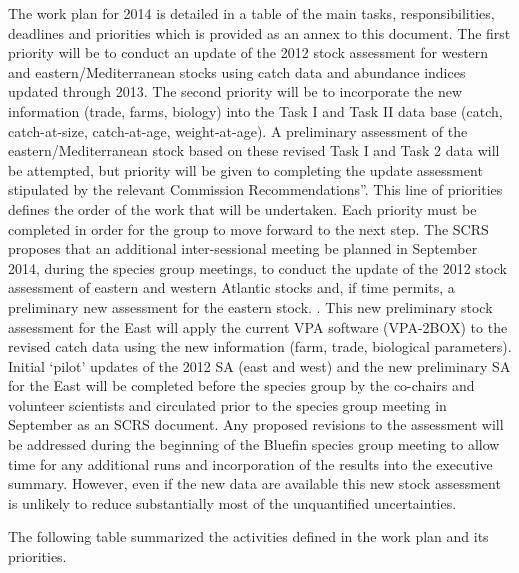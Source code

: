 The work plan for 2014 is detailed in a table of the main tasks, responsibilities, deadlines and priorities which is provided as an annex to this document. The first priority will be to conduct an update of the 2012 stock assessment for western and eastern/Mediterranean stocks using catch data and abundance indices updated through 2013. The second priority will be to incorporate the new information (trade, farms, biology) into the Task I and Task II data base (catch, catch-at-size, catch-at-age, weight-at-age). A preliminary assessment of the eastern/Mediterranean stock based on these revised Task I and Task 2 data will be attempted, but priority will be given to completing the update assessment stipulated by the relevant Commission Recommendations”. This line of priorities defines the order of the work that will be undertaken. Each priority must be completed in order for the group to move forward to the next step. The SCRS proposes that an additional inter-sessional meeting be planned in September 2014, during the species group meetings, to conduct the update of the 2012 stock assessment of eastern and western Atlantic stocks and, if time permits, a preliminary new assessment for the eastern stock. . This new preliminary stock assessment for the East will apply the current VPA software (VPA-2BOX) to the revised catch data using the new information (farm, trade, biological parameters). Initial ‘pilot’ updates of the 2012 SA (east and west) and the new preliminary SA for the East will be completed before the species group by the co-chairs and volunteer scientists and circulated prior to the species group meeting in September as an SCRS document. Any proposed revisions to the assessment will be addressed during the beginning of the Bluefin species group meeting to allow time for any additional runs and incorporation of the results into the executive summary. However, even if the new data are available this new stock assessment is unlikely to reduce substantially most of the unquantified uncertainties.

The following table summarized the activities defined in the work plan and its priorities. 



